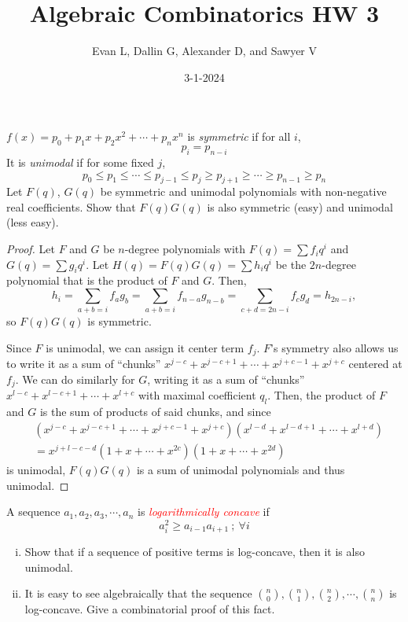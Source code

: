 \documentclass[11pt]{scrartcl}
\title{Algebraic Combinatorics HW 3}
\author{Evan L, Dallin G, Alexander D, and Sawyer V}
\date{3-1-2024}
\begin{document}
\maketitle
\setcounter{section}{1}
\begin{problem}
    $f(x)= p_0 + p_1x + p_2x^2 + \cdots + p_nx^n$ is \textit{symmetric} if for all $i$, $$p_i=p_{n-i}$$ It is \textit{unimodal} if for some fixed $j$, $$p_0\le p_1\le \cdots \le p_{j-1}\le p_j \ge p_{j+1}\ge \cdots \ge p_{n-1}\ge p_n$$ Let $F(q)$, $G(q)$ be symmetric and unimodal polynomials with non-negative real coefficients. Show that $F(q)G(q)$ is also symmetric (easy) and unimodal (less easy).
\end{problem}
\begin{proof}
Let $F$ and $G$ be $n$-degree polynomials with $F(q)=\sum f_iq^i$ and $G(q)=\sum g_iq^i$. Let $H(q)=F(q)G(q)=\sum h_i q^i$ be the $2n$-degree polynomial that is the product of $F$ and $G$. Then, \[h_i=\sum_{a+b=i}f_ag_b=\sum_{a+b=i}f_{n-a}g_{n-b}=\sum_{c+d=2n-i}f_cg_d=h_{2n-i},\] so $F(q)G(q)$ is symmetric.

Since $F$ is unimodal, we can assign it center term $f_j$. $F$'s symmetry also allows us to write it as a sum of ``chunks'' $x^{j-c}+x^{j-c+1}+\cdots+x^{j+c-1}+x^{j+c}$  centered at $f_j$. We can do similarly for $G$, writing it as a sum of ``chunks'' $x^{l-c}+x^{l-c+1}+\cdots+x^{l+c}$ with maximal coefficient $q_l$. Then, the product of $F$ and $G$ is the sum of products of said chunks, and since 
\begin{align*}
    &(x^{j-c}+x^{j-c+1}+\cdots+x^{j+c-1}+x^{j+c})(x^{l-d}+x^{l-d+1}+\cdots+x^{l+d})\\
    &=x^{j+l-c-d}(1+x+\cdots+x^{2c})(1+x+\cdots+x^{2d})
\end{align*}
is unimodal, $F(q)G(q)$ is a sum of unimodal polynomials and thus unimodal.
\end{proof}
\begin{problem}[\textcolor{red}{Log-concavity of Binomial coefficients}]
    A sequence $a_1,a_2, a_3, \cdots, a_n$ is \textcolor{red}{\textit{logarithmically concave}} if $$a_i^2\ge a_{i-1}a_{i+1}~;~ \forall i$$

    \begin{enumerate}[(i)]
        \item Show that if a sequence of positive terms is log-concave, then it is also unimodal.\smallskip
        \item It is easy to see algebraically that the sequence $\binom{n}{0},\binom{n}{1}, \binom{n}{2}, \cdots, \binom{n}{n}$ is log-concave. Give a combinatorial proof of this fact.
    \end{enumerate}
\end{problem}
\end{document}
